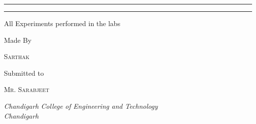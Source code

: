 \documentclass[a4paper, 11pt, oneside]{book} %
\begin{document}
\begin{titlepage}
	\vspace{0.75\baselineskip} %
	
	\rule{\textwidth}{0.4pt}\vspace*{-\baselineskip}\vspace{3.2pt} %
	\rule{\textwidth}{1.6pt} %
	
	\vspace{2\baselineskip} %
	
	
	All Experiments performed in the labs %
	
	\vspace*{3\baselineskip} %
	
	
	Made By
	
	\vspace{0.5\baselineskip} %
	
	{\scshape\Large Sarthak \\} %
	
	\vfill %
	
	
	Submitted to 
	
	\vspace{0.5\baselineskip} %
	
	{\scshape\Large Mr. Sarabjeet \\} %
	
	\vspace{0.5\baselineskip} %
	
	\textit{Chandigarh College of Engineering and Technology \\ Chandigarh} %
	
	\vfill %
	

\end{titlepage}

\end{document}
